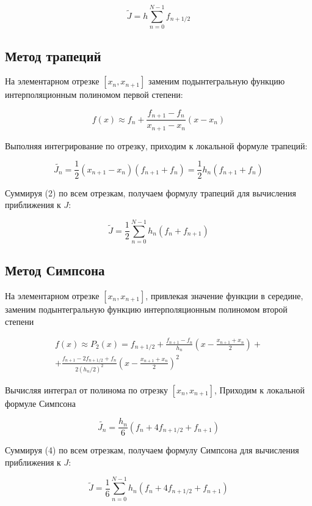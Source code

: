 \documentclass[a4paper,11pt]{article}
\begin{document}
$$
\tilde{J} = h \sum_{n=0}^{N-1} f_{n+1/2}
$$

\subsection{Метод трапеций}

На элементарном отрезке $ [x_n, x_{n+1}] $ заменим подынтегральную функцию
интерполяционным полиномом первой степени:

$$
f(x) \approx f_n + \frac{f_{n+1} - f_n}{x_{n+1} - x_n}(x - x_n)
$$

Выполняя интегрирование по отрезку, приходим к локальной формуле
трапеций:

\begin{equation}
\tilde{J_n} = \frac{1}{2} (x_{n+1} - x_n)(f_{n+1} + f_n) = \frac{1}{2} h_n (f_{n+1} + f_n)
\end{equation}

Суммируя (2) по всем отрезкам, получаем формулу трапеций
для вычисления приближения к $J$:

$$
\tilde{J} = \frac{1}{2} \sum_{n=0}^{N-1} h_n (f_n + f_{n+1})
$$

\subsection{Метод Симпсона}

На элементарном отрезке $[x_n, x_{n+1}]$,
привлекая значение функции в середине, заменим подынтегральную функцию интерполяционным полиномом второй степени

\begin{equation}
\begin{split}
f(x) \approx P_2(x) = f_{n+1/2} + \frac{f_{n+1} - f_n}{h_n} (x - \frac{x_{n+1} + x_n}{2}) + \\
+ \frac{f_{n+1} - 2f_{n+1/2} + f_n}{2(h_n/2)^2} (x - \frac{x_{n+1} + x_n}{2})^2
\end{split}
\end{equation}

Вычисляя интеграл от полинома по отрезку $[x_n, x_{n+1}]$, Приходим к
локальной формуле Симпсона

\begin{equation}
\tilde{J_n} = \frac{h_n}{6} (f_n + 4f_{n+1/2} + f_{n+1})
\end{equation}

Суммируя (4) по всем отрезкам, получаем формулу Симпсона для
вычисления приближения к $J$:

\begin{equation}
\tilde{J} = \frac{1}{6} \sum_{n=0}^{N-1} h_n (f_n + 4f_{n+1/2} + f_{n+1})
\end{equation}
\end{document}
